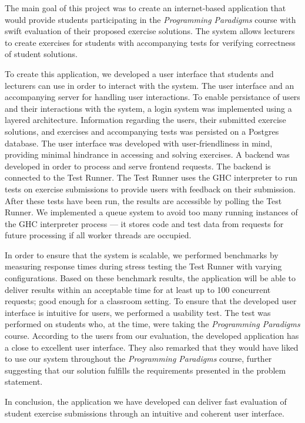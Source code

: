 The main goal of this project was to create an internet-based application that would provide students participating in the \textit{Programming Paradigms} course with swift evaluation of their proposed exercise solutions.
The system allows lecturers to create exercises for students with accompanying tests for verifying correctness of student solutions.

To create this application, we developed a user interface that students and lecturers can use in order to interact with the system. The user interface and an accompanying server for handling user interactions.
To enable persistance of users and their interactions with the system, a login system was implemented using a layered architecture.
Information regarding the users, their submitted exercise solutions, and exercises and accompanying tests was persisted on a Postgres database.
The user interface was developed with user-friendliness in mind, providing minimal hindrance in accessing and solving exercises.
A backend was developed in order to process and serve frontend requests.
The backend is connected to the Test Runner. The Test Runner uses the GHC interpreter to run tests on exercise submissions to provide users with feedback on their submission.
After these tests have been run, the results are accessible by polling the Test Runner.
We implemented a queue system to avoid too many running instances of the GHC interpreter process --- it stores code and test data from requests for future processing if all worker threads are occupied.

In order to ensure that the system is scalable, we performed benchmarks by measuring response times during stress testing the Test Runner with varying configurations.
Based on these benchmark results, the application will be able to deliver results within an acceptable time for at least up to 100 concurrent requests; good enough for a classroom setting.
To ensure that the developed user interface is intuitive for users, we performed a usability test.
The test was performed on students who, at the time, were taking the \textit{Programming Paradigms} course.
According to the users from our evaluation, the developed application has a close to excellent user interface.
They also remarked that they would have liked to use our system throughout the \textit{Programming Paradigms} course, further suggesting that our solution fulfills the requirements presented in the problem statement.

In conclusion, the application we have developed can deliver fast evaluation of student exercise submissions through an intuitive and coherent user interface.